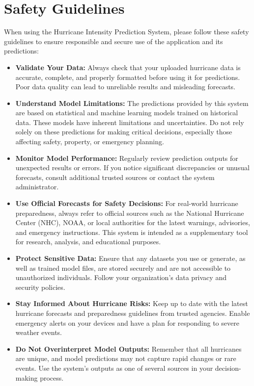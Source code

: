 %
%

\chapter{Safety Guidelines}

When using the Hurricane Intensity Prediction System, please follow these safety guidelines to ensure responsible and secure use of the application and its predictions:

\begin{itemize}
	\item \textbf{Validate Your Data:} Always check that your uploaded hurricane data is accurate, complete, and properly formatted before using it for predictions. Poor data quality can lead to unreliable results and misleading forecasts.
	
	\item \textbf{Understand Model Limitations:} The predictions provided by this system are based on statistical and machine learning models trained on historical data. These models have inherent limitations and uncertainties. Do not rely solely on these predictions for making critical decisions, especially those affecting safety, property, or emergency planning.
	
	\item \textbf{Monitor Model Performance:} Regularly review prediction outputs for unexpected results or errors. If you notice significant discrepancies or unusual forecasts, consult additional trusted sources or contact the system administrator.
	
	\item \textbf{Use Official Forecasts for Safety Decisions:} For real-world hurricane preparedness, always refer to official sources such as the National Hurricane Center (NHC), NOAA, or local authorities for the latest warnings, advisories, and emergency instructions. This system is intended as a supplementary tool for research, analysis, and educational purposes.
	
	\item \textbf{Protect Sensitive Data:} Ensure that any datasets you use or generate, as well as trained model files, are stored securely and are not accessible to unauthorized individuals. Follow your organization’s data privacy and security policies.
	
	\item \textbf{Stay Informed About Hurricane Risks:} Keep up to date with the latest hurricane forecasts and preparedness guidelines from trusted agencies. Enable emergency alerts on your devices and have a plan for responding to severe weather events.
	
	\item \textbf{Do Not Overinterpret Model Outputs:} Remember that all hurricanes are unique, and model predictions may not capture rapid changes or rare events. Use the system’s outputs as one of several sources in your decision-making process.
\end{itemize}








